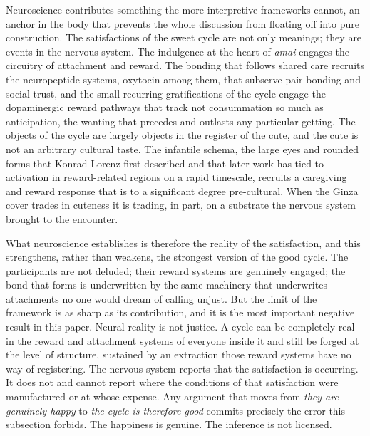 \documentclass[11pt,a4paper]{article}
\begin{document}
Neuroscience contributes something the more interpretive frameworks cannot, an anchor in the body that prevents the whole discussion from floating off into pure construction. The satisfactions of the sweet cycle are not only meanings; they are events in the nervous system. The indulgence at the heart of \textit{amai} engages the circuitry of attachment and reward. The bonding that follows shared care recruits the neuropeptide systems, oxytocin among them, that subserve pair bonding and social trust, and the small recurring gratifications of the cycle engage the dopaminergic reward pathways that track not consummation so much as anticipation, the wanting that precedes and outlasts any particular getting. The objects of the cycle are largely objects in the register of the cute, and the cute is not an arbitrary cultural taste. The infantile schema, the large eyes and rounded forms that Konrad Lorenz first described and that later work has tied to activation in reward-related regions on a rapid timescale, recruits a caregiving and reward response that is to a significant degree pre-cultural. When the Ginza cover trades in cuteness it is trading, in part, on a substrate the nervous system brought to the encounter.

What neuroscience establishes is therefore the reality of the satisfaction, and this strengthens, rather than weakens, the strongest version of the good cycle. The participants are not deluded; their reward systems are genuinely engaged; the bond that forms is underwritten by the same machinery that underwrites attachments no one would dream of calling unjust. But the limit of the framework is as sharp as its contribution, and it is the most important negative result in this paper. Neural reality is not justice. A cycle can be completely real in the reward and attachment systems of everyone inside it and still be forged at the level of structure, sustained by an extraction those reward systems have no way of registering. The nervous system reports that the satisfaction is occurring. It does not and cannot report where the conditions of that satisfaction were manufactured or at whose expense. Any argument that moves from \textit{they are genuinely happy} to \textit{the cycle is therefore good} commits precisely the error this subsection forbids. The happiness is genuine. The inference is not licensed.
\end{document}
